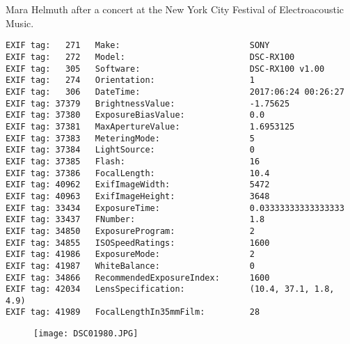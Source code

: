 \section{\protect{}}
\noindent Mara Helmuth after a concert at the New York City Festival of Electroacoustic Music.
\noindent
\begin{lstlisting}
EXIF tag:   271   Make:                          SONY
EXIF tag:   272   Model:                         DSC-RX100
EXIF tag:   305   Software:                      DSC-RX100 v1.00
EXIF tag:   274   Orientation:                   1
EXIF tag:   306   DateTime:                      2017:06:24 00:26:27
EXIF tag: 37379   BrightnessValue:               -1.75625
EXIF tag: 37380   ExposureBiasValue:             0.0
EXIF tag: 37381   MaxApertureValue:              1.6953125
EXIF tag: 37383   MeteringMode:                  5
EXIF tag: 37384   LightSource:                   0
EXIF tag: 37385   Flash:                         16
EXIF tag: 37386   FocalLength:                   10.4
EXIF tag: 40962   ExifImageWidth:                5472
EXIF tag: 40963   ExifImageHeight:               3648
EXIF tag: 33434   ExposureTime:                  0.03333333333333333
EXIF tag: 33437   FNumber:                       1.8
EXIF tag: 34850   ExposureProgram:               2
EXIF tag: 34855   ISOSpeedRatings:               1600
EXIF tag: 41986   ExposureMode:                  2
EXIF tag: 41987   WhiteBalance:                  0
EXIF tag: 34866   RecommendedExposureIndex:      1600
EXIF tag: 42034   LensSpecification:             (10.4, 37.1, 1.8, 4.9)
EXIF tag: 41989   FocalLengthIn35mmFilm:         28

\end{lstlisting}
\clearpage
\begin{figure}
\raggedleft
\texttt{[image: DSC01980.JPG]}
\end{figure}


\clearpage
